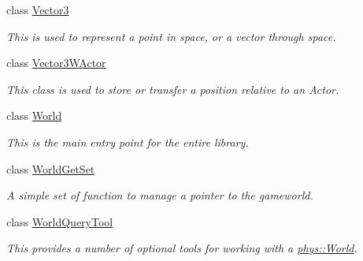 \begin{DoxyCompactItemize}
class \hyperlink{classphys_1_1Vector3}{Vector3}
\begin{DoxyCompactList}\small\item\em This is used to represent a point in space, or a vector through space. \item\end{DoxyCompactList}\item 
class \hyperlink{classphys_1_1Vector3WActor}{Vector3WActor}
\begin{DoxyCompactList}\small\item\em This class is used to store or transfer a position relative to an Actor. \item\end{DoxyCompactList}\item 
class \hyperlink{classphys_1_1World}{World}
\begin{DoxyCompactList}\small\item\em This is the main entry point for the entire library. \item\end{DoxyCompactList}\item 
class \hyperlink{classphys_1_1WorldGetSet}{WorldGetSet}
\begin{DoxyCompactList}\small\item\em A simple set of function to manage a pointer to the gameworld. \item\end{DoxyCompactList}\item 
class \hyperlink{classphys_1_1WorldQueryTool}{WorldQueryTool}
\begin{DoxyCompactList}\small\item\em This provides a number of optional tools for working with a \hyperlink{classphys_1_1World}{phys::World}. \item\end{DoxyCompactList}\end{DoxyCompactItemize}
